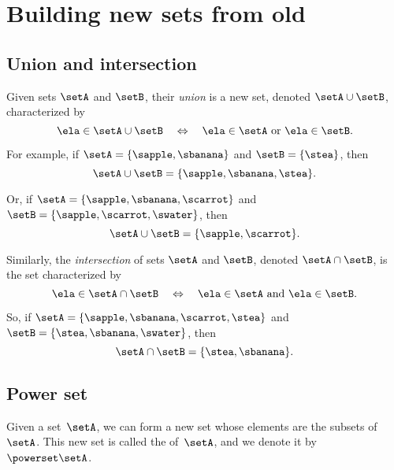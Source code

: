 
\section{Building new sets from old}



\subsection{Union and intersection}

Given sets $\setA$ and $\setB$, their \emph{union} is a new set, denoted $\setA \cup \setB$, characterized by 
\begin{equation*}
\ela \in \setA \cup \setB \quad \Leftrightarrow \quad \ela \in \setA \ \text{or} \ \ela \in \setB. 
\end{equation*}

For example, if $\setA = \{ \sapple, \sbanana \}$ and $\setB = \{ \stea \}$, then 
\begin{equation*}
\setA \cup \setB = \{ \sapple, \sbanana, \stea \}. 
\end{equation*}

Or, if $\setA = \{ \sapple, \sbanana, \scarrot \}$ and $\setB = \{ \sapple, \scarrot, \swater \}$, then
\begin{equation*}
\setA \cup \setB = \{ \sapple, \scarrot \}. 
\end{equation*}

Similarly, the \emph{intersection} of sets $\setA$ and $\setB$, denoted $\setA \cap \setB$, is the set characterized by 
\begin{equation*}
\ela \in \setA \cap \setB \quad \Leftrightarrow \quad \ela \in \setA \ \text{and} \ \ela \in \setB. 
\end{equation*}

So, if $\setA = \{ \sapple, \sbanana, \scarrot, \stea \}$ and $\setB = \{ \stea, \sbanana, \swater \}$, then
\begin{equation*}
\setA \cap \setB = \{ \stea, \sbanana \}. 
\end{equation*}

\subsection{Power set}
\label{sec:power-set}

\begin{ctdefinition}
    \label{def:power-set}
    Given a set~$\setA$, we can form a new set whose elements are the subsets of~$\setA$.
    This new set is called the  of~$\setA$, and we denote it by~$\powerset \setA$.
\end{ctdefinition}

